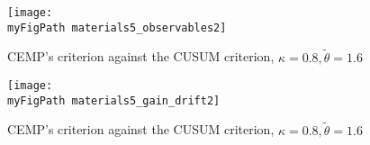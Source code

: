 \documentclass[11pt]{article}
\def \myFigPath {../figures/}
\renewcommand{\[}{\begin{equation}}
\renewcommand{\]}{\end{equation}}
\def\myFigScale{0.3}
\begin{document}
\begin{figure}[h!]
\texttt{[image: \\myFigPath materials5\_observables2]} 
\caption{CEMP's criterion against the CUSUM criterion, $\kappa = 0.8, \tilde{\theta} = 1.6$}
\end{figure}
\begin{figure}[h!]
\texttt{[image: \\myFigPath materials5\_gain\_drift2]} 
\caption{CEMP's criterion against the CUSUM criterion, $\kappa = 0.8, \tilde{\theta} = 1.6$}
\end{figure}
\end{document}
